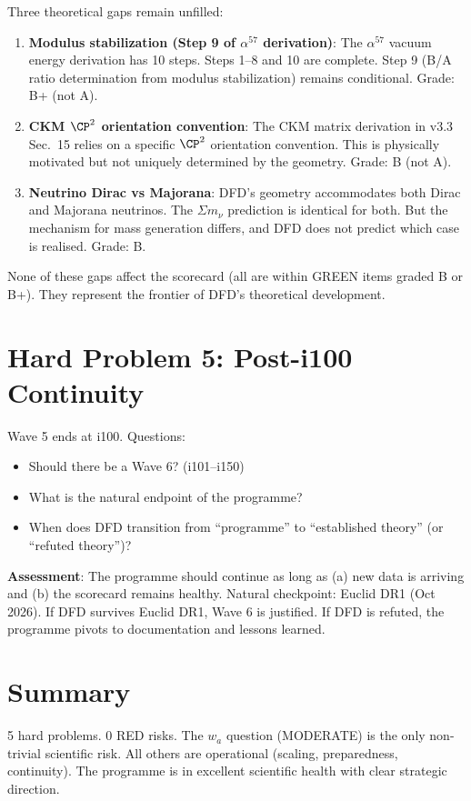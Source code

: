 \documentclass[11pt,a4paper]{article}
\begin{document}
Three theoretical gaps remain unfilled:
\begin{enumerate}[nosep]
\item \textbf{Modulus stabilization (Step 9 of $\alpha^{57}$ derivation)}: The $\alpha^{57}$ vacuum energy derivation has 10 steps. Steps 1--8 and 10 are complete. Step 9 (B/A ratio determination from modulus stabilization) remains conditional. Grade: B+ (not A).

\item \textbf{CKM $\CP^2$ orientation convention}: The CKM matrix derivation in v3.3 Sec.~15 relies on a specific $\CP^2$ orientation convention. This is physically motivated but not uniquely determined by the geometry. Grade: B (not A).

\item \textbf{Neutrino Dirac vs Majorana}: DFD's geometry accommodates both Dirac and Majorana neutrinos. The $\Sigma m_\nu$ prediction is identical for both. But the mechanism for mass generation differs, and DFD does not predict which case is realised. Grade: B.
\end{enumerate}

None of these gaps affect the scorecard (all are within GREEN items graded B or B+). They represent the frontier of DFD's theoretical development.

\section{Hard Problem 5: Post-i100 Continuity}

Wave 5 ends at i100. Questions:
\begin{itemize}[nosep]
\item Should there be a Wave 6? (i101--i150)
\item What is the natural endpoint of the programme?
\item When does DFD transition from ``programme'' to ``established theory'' (or ``refuted theory'')?
\end{itemize}

\textbf{Assessment}: The programme should continue as long as (a) new data is arriving and (b) the scorecard remains healthy. Natural checkpoint: Euclid DR1 (Oct 2026). If DFD survives Euclid DR1, Wave 6 is justified. If DFD is refuted, the programme pivots to documentation and lessons learned.

\section{Summary}

5 hard problems. 0 RED risks. The $w_a$ question (MODERATE) is the only non-trivial scientific risk. All others are operational (scaling, preparedness, continuity). The programme is in excellent scientific health with clear strategic direction.
\end{document}
